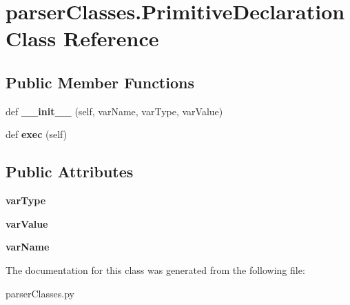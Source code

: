\hypertarget{classparser_classes_1_1_primitive_declaration}{}\section{parser\+Classes.\+Primitive\+Declaration Class Reference}
\label{classparser_classes_1_1_primitive_declaration}
\subsection*{Public Member Functions}
\begin{DoxyCompactItemize}
\item 
def {\bfseries \+\_\+\+\_\+init\+\_\+\+\_\+} (self, var\+Name, var\+Type, var\+Value)\hypertarget{classparser_classes_1_1_primitive_declaration_aad9639eb073bcb44bc75a89c944df91b}{}\label{classparser_classes_1_1_primitive_declaration_aad9639eb073bcb44bc75a89c944df91b}

\item 
def {\bfseries exec} (self)\hypertarget{classparser_classes_1_1_primitive_declaration_a438696675269a0bcb077b6e60acf7bfd}{}\label{classparser_classes_1_1_primitive_declaration_a438696675269a0bcb077b6e60acf7bfd}

\end{DoxyCompactItemize}
\subsection*{Public Attributes}
\begin{DoxyCompactItemize}
\item 
{\bfseries var\+Type}\hypertarget{classparser_classes_1_1_primitive_declaration_af0de807df30562cc04fbd425ea1e2ad1}{}\label{classparser_classes_1_1_primitive_declaration_af0de807df30562cc04fbd425ea1e2ad1}

\item 
{\bfseries var\+Value}\hypertarget{classparser_classes_1_1_primitive_declaration_a2f493d5ebb420d75e5184c520e2fa66b}{}\label{classparser_classes_1_1_primitive_declaration_a2f493d5ebb420d75e5184c520e2fa66b}

\item 
{\bfseries var\+Name}\hypertarget{classparser_classes_1_1_primitive_declaration_abda8fb36580c90aea36e32f8d0785f6c}{}\label{classparser_classes_1_1_primitive_declaration_abda8fb36580c90aea36e32f8d0785f6c}

\end{DoxyCompactItemize}


The documentation for this class was generated from the following file\+:\begin{DoxyCompactItemize}
\item 
parser\+Classes.\+py\end{DoxyCompactItemize}
